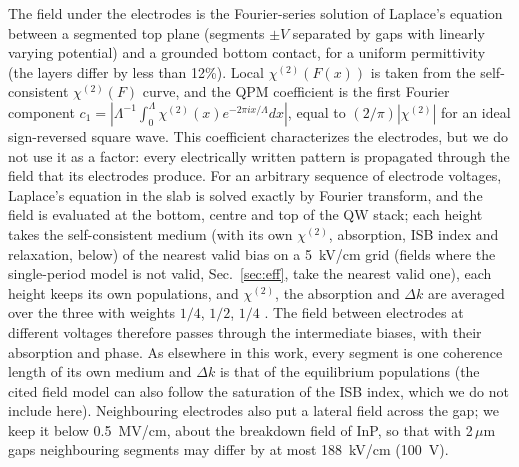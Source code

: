 \documentclass[11pt]{article}
\newcommand{\chitwo}{\chi^{(2)}}
\newcommand{\um}{\,\mu\mathrm{m}}
\begin{document}
The field under the electrodes is the Fourier-series solution of Laplace's equation between a segmented top plane (segments $\pm V$ separated by gaps with linearly varying potential) and a grounded bottom contact, for a uniform permittivity (the layers differ by less than 12\%). Local $\chitwo(F(x))$ is taken from the self-consistent $\chitwo(F)$ curve, and the QPM coefficient is the first Fourier component $c_1=|\Lambda^{-1}\int_0^\Lambda\chitwo(x)e^{-2\pi ix/\Lambda}dx|$, equal to $(2/\pi)|\chitwo|$ for an ideal sign-reversed square wave. This coefficient characterizes the electrodes, but we do not use it as a factor: every electrically written pattern is propagated through the field that its electrodes produce. For an arbitrary sequence of electrode voltages, Laplace's equation in the slab is solved exactly by Fourier transform, and the field is evaluated at the bottom, centre and top of the QW stack; each height takes the self-consistent medium (with its own $\chitwo$, absorption, ISB index and relaxation, below) of the nearest valid bias on a 5~kV/cm grid (fields where the single-period model is not valid, Sec.~\ref{sec:eff}, take the nearest valid one), each height keeps its own populations, and $\chitwo$, the absorption and $\Delta k$ are averaged over the three with weights $1/4$, $1/2$, $1/4$ \cite{OwnbyN2}. The field between electrodes at different voltages therefore passes through the intermediate biases, with their absorption and phase. As elsewhere in this work, every segment is one coherence length of its own medium and $\Delta k$ is that of the equilibrium populations (the cited field model can also follow the saturation of the ISB index, which we do not include here). Neighbouring electrodes also put a lateral field across the gap; we keep it below 0.5~MV/cm, about the breakdown field of InP, so that with 2$\um$ gaps neighbouring segments may differ by at most 188~kV/cm (100~V).
\end{document}
